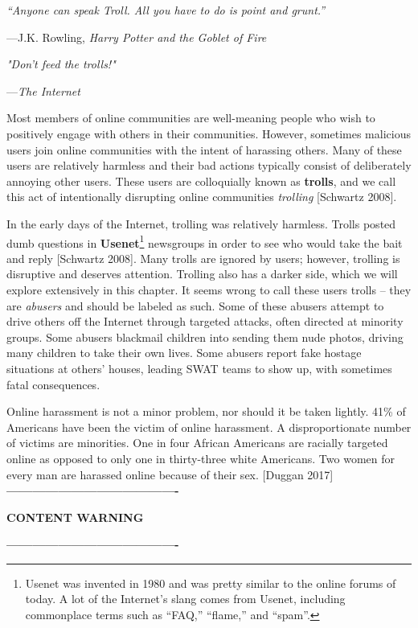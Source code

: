 \documentclass[class=book, crop=false]{standalone}
\providecommand{\keyterm}[1]{\textbf{#1}\marginnote{\scriptsize \textbf{#1}}}
\begin{document}
\epigraph{\itshape “Anyone can speak Troll. All you have to do is point and grunt.”}{---J.K. Rowling, \textit{Harry Potter and the Goblet of Fire}}

\epigraph{\itshape "Don't feed the trolls!"}{---\textit{The Internet}}

Most members of online communities are well-meaning people who wish to positively engage with others in their communities. However, sometimes malicious users join online communities with the intent of harassing others. Many of these users are relatively harmless and their bad actions typically consist of deliberately annoying other users. These users are colloquially known as \keyterm{trolls}, and we call this act of intentionally disrupting online communities \textit{trolling} [Schwartz 2008].

In the early days of the Internet, trolling was relatively harmless. Trolls posted dumb questions in \keyterm{Usenet}\footnote{Usenet was invented in 1980 and was pretty similar to the online forums of today. A lot of the Internet’s slang comes from Usenet, including commonplace terms such as “FAQ,” “flame,” and “spam”.} newsgroups in order to see who would take the bait and reply [Schwartz 2008]. Many trolls are ignored by users; however, trolling is disruptive and deserves attention. Trolling also has a darker side, which we will explore extensively in this chapter. It seems wrong to call these users trolls -- they are \textit{abusers} and should be labeled as such. Some of these abusers attempt to drive others off the Internet through targeted attacks, often directed at minority groups. Some abusers blackmail children into sending them nude photos, driving many children to take their own lives. Some abusers report fake hostage situations at others' houses, leading SWAT teams to show up, with sometimes fatal consequences.

Online harassment is not a minor problem, nor should it be taken lightly. 41\% of Americans have been the victim of online harassment. A disproportionate number of victims are minorities. One in four African Americans are racially targeted online as opposed to only one in thirty-three white Americans. Two women for every man are harassed online because of their sex. [Duggan 2017]\\

\textbf{----------------------------------------}

\textbf{CONTENT WARNING}

\textbf{----------------------------------------}
\end{document}
